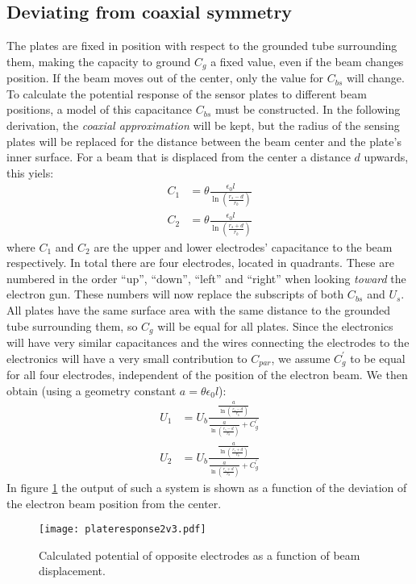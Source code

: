 \subsection{Deviating from coaxial symmetry}
The plates are fixed in position with respect to the grounded tube surrounding them, making the capacity to ground $C_g$ a fixed value, even if the beam changes position. If the beam moves out of the center, only the value for $C_{bs}$ will change.
To calculate the potential response of the sensor plates to different beam positions, a model of this capacitance $C_{bs}$ must be constructed. 
In the following derivation, the \textit{coaxial approximation} will be kept, but the radius of the sensing plates will be replaced for the distance between the beam center and the plate's inner surface. For a beam that is displaced from the center a distance $d$ upwards, this yiels:
\begin{align}
C_1 &= \theta \frac{\epsilon_0l}{\ln\left(\frac{r_s-d}{r_b}\right)} \\
C_2 &= \theta \frac{\epsilon_0l}{\ln\left(\frac{r_s+d}{r_b}\right)}
\end{align}
where $C_1$ and $C_2$ are the upper and lower electrodes' capacitance to the beam respectively. In total there are four electrodes, located in quadrants. These are numbered in the order ``up'', ``down'', ``left'' and ``right'' when looking \textit{toward} the electron gun. These numbers will now replace the subscripts of both $C_{bs}$ and $U_s$.
All plates have the same surface area with the same distance to the grounded tube surrounding them, so $C_g$ will be equal for all plates. Since the electronics will have very similar capacitances and the wires connecting the electrodes to the electronics will have a very small contribution to $C_{par}$, we assume $C_g^\prime$ to be equal for all four electrodes, independent of the position of the electron beam.
We then obtain (using a geometry constant $a=\theta\epsilon_0l$):
\begin{align}
U_1 &= U_b\frac{\frac{a}{\ln\left(\frac{r_s-d}{r_b}\right)}}{\frac{a}{\ln\left(\frac{r_s-d}{r_b}\right)}+C_g^\prime} \\
U_2 &= U_b\frac{\frac{a}{\ln\left(\frac{r_s+d}{r_b}\right)}}{\frac{a}{\ln\left(\frac{r_s+d}{r_b}\right)}+C_g^\prime} \label{eq:plateresponse}
\end{align}
In figure \ref{fig:plateresponse} the output of such a system is shown as a function of the deviation of the electron beam position from the center.
\begin{figure}[hb!]
\centering
\texttt{[image: plateresponse2v3.pdf]}
\caption{ Calculated potential of opposite electrodes as a function of beam displacement.}
\label{fig:plateresponse}
\end{figure}


